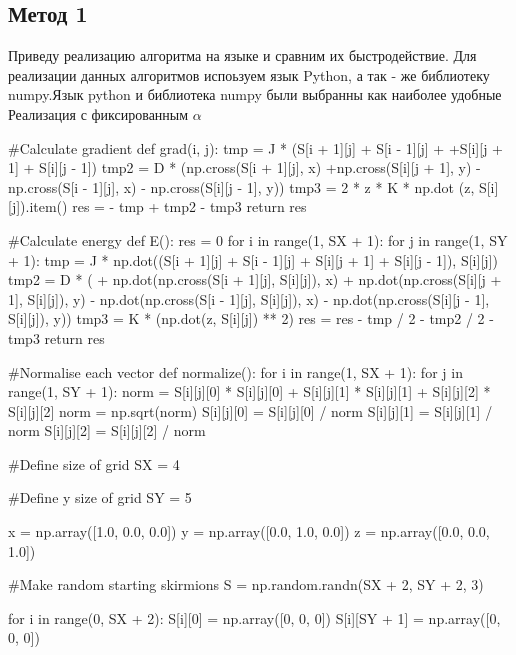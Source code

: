 \documentclass[ 12pt,x11names]{article}
\begin{document}
    \subsection{Метод 1}
    Приведу реализацию алгоритма на языке и сравним их быстродействие.
    Для реализации данных алгоритмов испоьзуем язык Python, а так - же библиотеку numpy.Язык python и библиотека numpy  были выбранны как наиболее удобные
    Реализация с фиксированным $\alpha$\\
\begin{python}
    #Calculate gradient
    def grad(i, j):
        tmp = J * (S[i + 1][j] + S[i - 1][j] +
        +S[i][j + 1] + S[i][j - 1])
        tmp2 = D * (np.cross(S[i + 1][j], x)
        +np.cross(S[i][j + 1], y)
        - np.cross(S[i - 1][j], x)
        - np.cross(S[i][j - 1], y))
        tmp3 = 2 * z * K * np.dot  (z, S[i][j]).item()
        res = - tmp + tmp2 - tmp3
        return res

    #Calculate energy
    def E():
        res = 0
        for i in range(1, SX + 1):
            for j in range(1, SY + 1):
                tmp = J * np.dot((S[i + 1][j] + S[i - 1][j] +
                S[i][j + 1] + S[i][j - 1]), S[i][j])
                tmp2 = D * (
                + np.dot(np.cross(S[i + 1][j], S[i][j]), x)
                + np.dot(np.cross(S[i][j + 1], S[i][j]), y)
                - np.dot(np.cross(S[i - 1][j], S[i][j]), x)
                - np.dot(np.cross(S[i][j - 1], S[i][j]), y))
                tmp3 = K * (np.dot(z, S[i][j]) ** 2)
                res = res - tmp / 2 - tmp2 / 2 - tmp3
        return res

    #Normalise each vector
    def normalize():
    for i in range(1, SX + 1):
        for j in range(1, SY + 1):
            norm = S[i][j][0] * S[i][j][0] +
                   S[i][j][1] * S[i][j][1] +
                   S[i][j][2] * S[i][j][2]
            norm = np.sqrt(norm)
            S[i][j][0] = S[i][j][0] / norm
            S[i][j][1] = S[i][j][1] / norm
            S[i][j][2] = S[i][j][2] / norm


    #Define size of grid
    SX = 4

    #Define y size of grid
    SY = 5

    x = np.array([1.0, 0.0, 0.0])
    y = np.array([0.0, 1.0, 0.0])
    z = np.array([0.0, 0.0, 1.0])

    #Make random starting skirmions
    S = np.random.randn(SX + 2, SY + 2, 3)

    for i in range(0, SX + 2):
        S[i][0] = np.array([0, 0, 0])
        S[i][SY + 1] = np.array([0, 0, 0])


\end{python}
\end{document}
